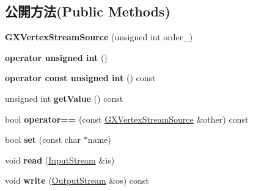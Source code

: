 \subsection*{公開方法(Public Methods)}
\begin{DoxyCompactItemize}
\item 
{\bfseries G\+X\+Vertex\+Stream\+Source} (unsigned int order\+\_)\hypertarget{class_i_dream_sky_1_1_g_x_vertex_stream_source_ae10dffbc6b625f796b1a7211f90479e1}{}\label{class_i_dream_sky_1_1_g_x_vertex_stream_source_ae10dffbc6b625f796b1a7211f90479e1}

\item 
{\bfseries operator unsigned int} ()\hypertarget{class_i_dream_sky_1_1_g_x_vertex_stream_source_a2658fb9c66c733eab735d989b8a0a894}{}\label{class_i_dream_sky_1_1_g_x_vertex_stream_source_a2658fb9c66c733eab735d989b8a0a894}

\item 
{\bfseries operator const unsigned int} () const \hypertarget{class_i_dream_sky_1_1_g_x_vertex_stream_source_ab23dfffabf2ec96f46dc9e8130c306ba}{}\label{class_i_dream_sky_1_1_g_x_vertex_stream_source_ab23dfffabf2ec96f46dc9e8130c306ba}

\item 
unsigned int {\bfseries get\+Value} () const \hypertarget{class_i_dream_sky_1_1_g_x_vertex_stream_source_a7d88dcc1f49b5e15d79cbe687d5bbf23}{}\label{class_i_dream_sky_1_1_g_x_vertex_stream_source_a7d88dcc1f49b5e15d79cbe687d5bbf23}

\item 
bool {\bfseries operator==} (const \hyperlink{class_i_dream_sky_1_1_g_x_vertex_stream_source}{G\+X\+Vertex\+Stream\+Source} \&other) const \hypertarget{class_i_dream_sky_1_1_g_x_vertex_stream_source_acb54105e45e55873e25063dd3338d92b}{}\label{class_i_dream_sky_1_1_g_x_vertex_stream_source_acb54105e45e55873e25063dd3338d92b}

\item 
bool {\bfseries set} (const char $\ast$name)\hypertarget{class_i_dream_sky_1_1_g_x_vertex_stream_source_a7d9298a8c55aac4e7959f5377054d1d3}{}\label{class_i_dream_sky_1_1_g_x_vertex_stream_source_a7d9298a8c55aac4e7959f5377054d1d3}

\item 
void {\bfseries read} (\hyperlink{class_i_dream_sky_1_1_input_stream}{Input\+Stream} \&is)\hypertarget{class_i_dream_sky_1_1_g_x_vertex_stream_source_a692820f7a48fc74d9bb7cd2cc07919a2}{}\label{class_i_dream_sky_1_1_g_x_vertex_stream_source_a692820f7a48fc74d9bb7cd2cc07919a2}

\item 
void {\bfseries write} (\hyperlink{class_i_dream_sky_1_1_output_stream}{Output\+Stream} \&os) const \hypertarget{class_i_dream_sky_1_1_g_x_vertex_stream_source_a8360907abd2af0b1feaa7dffeaf5bc1e}{}\label{class_i_dream_sky_1_1_g_x_vertex_stream_source_a8360907abd2af0b1feaa7dffeaf5bc1e}

\end{DoxyCompactItemize}


